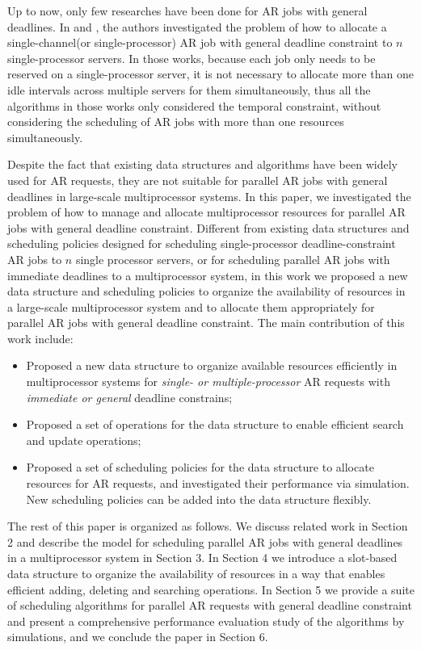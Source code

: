 \documentclass[preprint,12pt]{elsarticle}
\begin{document}
Up to now, only few researches have been done for AR jobs with general deadlines. In \cite{xu2004efficient} and \cite{castillo2011online,castillo2007design}, the authors investigated the problem of how to allocate a single-channel(or single-processor) AR job with general deadline constraint to $n$ single-processor servers. In those works, because each job only needs to be reserved on a single-processor server, it is not necessary to allocate more than one idle intervals across multiple servers for them simultaneously, thus all the algorithms in those works only considered the temporal constraint, without considering the scheduling of AR jobs with more than one resources simultaneously.



Despite the fact that existing data structures and algorithms have been widely used for AR requests, they are not suitable for parallel AR jobs with general deadlines in large-scale multiprocessor systems. In this paper, we investigated the problem of how to manage and allocate multiprocessor resources for parallel AR jobs with general deadline constraint. Different from existing data structures and scheduling policies designed for scheduling single-processor deadline-constraint AR jobs to $n$ single processor servers, or for scheduling parallel AR jobs with immediate deadlines to a multiprocessor system, in this work we proposed a new data structure and scheduling policies to organize the availability of resources in a large-scale multiprocessor system and to allocate them appropriately for parallel AR jobs with general deadline constraint. The main contribution of this work include:
\begin{itemize}
  \item {Proposed a new data structure to organize available resources efficiently in multiprocessor systems for \emph{single- or multiple-processor} AR requests with \emph{immediate or general }deadline constrains;}
  \item{Proposed a set of operations for the data structure to enable efficient search and update operations;}
\item{Proposed a set of scheduling policies for the data structure to allocate resources for AR requests, and investigated their performance via simulation. New scheduling policies can be added into the data structure flexibly.}
\end{itemize}


The rest of this paper is organized as follows. We discuss related work in Section 2 and describe the model for scheduling parallel AR jobs with general deadlines in a multiprocessor system in Section 3. In Section 4 we introduce a slot-based data structure to organize the availability of resources in a way that enables efficient adding, deleting and searching operations. In Section 5 we provide a suite of scheduling algorithms for parallel AR requests with general deadline constraint and present a comprehensive performance evaluation study of the algorithms by simulations, and we conclude the paper in Section 6.
\end{document}
